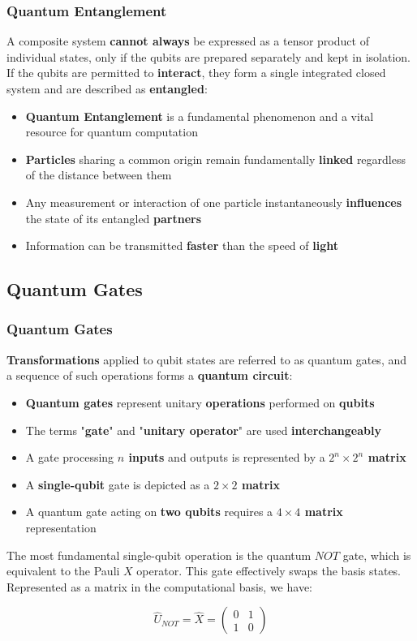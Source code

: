 \documentclass{beamer}
\begin{document}
\begin{frame}
	\frametitle{Quantum Entanglement}
	A composite system \textbf{cannot always} be expressed as a tensor product of individual states, only if the qubits are prepared separately and kept in isolation. If the qubits are permitted to \textbf{interact}, they form a single integrated closed system and are described as \textbf{entangled}:
	\begin{itemize}
		\item \textbf{Quantum Entanglement} is a fundamental phenomenon and a vital resource for quantum computation
		\item \textbf{Particles} sharing a common origin remain fundamentally \textbf{linked} regardless of the distance between them
		\item Any measurement or interaction of one particle instantaneously \textbf{influences} the state of its entangled \textbf{partners}
		\item Information can be transmitted \textbf{faster} than the speed of \textbf{light}
	\end{itemize}
\end{frame}

\subsection{Quantum Gates}

\begin{frame}
	\frametitle{Quantum Gates}
	\textbf{Transformations} applied to qubit states are referred to as quantum gates, and a sequence of such operations forms a \textbf{quantum circuit}:
	\begin{itemize}
		\item \textbf{Quantum gates} represent unitary \textbf{operations} performed on \textbf{qubits}
		\item The terms "\textbf{gate}" and "\textbf{unitary operator}" are used \textbf{interchangeably}
		\item A gate processing \textbf{$n$ inputs} and outputs is represented by a \textbf{$2^n \times 2^n$ matrix}
		\item A \textbf{single-qubit} gate is depicted as a \textbf{$2 \times 2$ matrix}
		\item A quantum gate acting on \textbf{two qubits} requires a \textbf{$4 \times 4$ matrix }representation
	\end{itemize}
	
	The most fundamental single-qubit operation is the quantum $NOT$ gate, which is equivalent to the Pauli $X$ operator. This gate effectively swaps the basis states. Represented as a matrix in the computational basis, we have:
	
	\begin{equation}
		\hat{U}_{NOT} = \hat{X} 
		= \begin{pmatrix} 
			0 & 1 \\ 
			1 & 0 
		\end{pmatrix} 
		\label{eq:Unot}
	\end{equation}

\end{frame}
\end{document}
